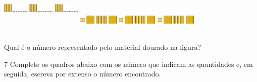 \includegraphics[width=0.47504in,height=1.02509in]{media/image3.png}
\includegraphics[width=0.47504in,height=1.02509in]{media/image3.png}
\includegraphics[width=0.47504in,height=1.02509in]{media/image3.png}
\includegraphics[width=0.75006in,height=0.55838in]{media/image4.png}
\includegraphics[width=0.75006in,height=0.55838in]{media/image4.png}
\includegraphics[width=0.75006in,height=0.55838in]{media/image4.png}

Qual é o número representado pelo material dourado na figura?


\num{7} Complete os quadros abaixo com os número que indicam as quantidades e, em
seguida, escreva por extenso o número encontrado.

